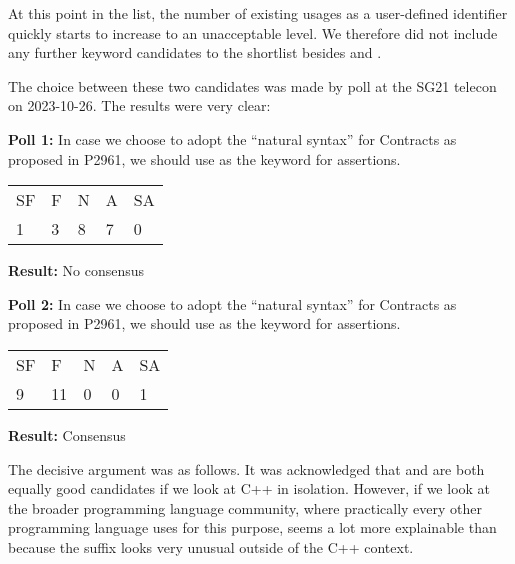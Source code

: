 At this point in the list, the number of existing usages as a user-defined identifier quickly starts to increase to an unacceptable level. We therefore did not include any further keyword candidates to the shortlist besides  and .

\pagebreak %

The choice between these two candidates was made by poll at the SG21 telecon on 2023-10-26. The results were very clear:



\begin{adjustwidth}{0.5cm}{0.5cm}
\textbf{Poll 1:} In case we choose to adopt the ``natural syntax'' for Contracts as proposed in 
P2961, we should use  as the keyword for assertions.

\begin{tabular}{lllll}
SF & F & N & A & SA \\
1 & 3 & 8 & 7 & 0
\end{tabular}

\textbf{Result:} No consensus
\end{adjustwidth}

\begin{adjustwidth}{0.5cm}{0.5cm}
\textbf{Poll 2:} In case we choose to adopt the ``natural syntax'' for Contracts as proposed in 
P2961, we should use  as the keyword for assertions.

\begin{tabular}{lllll}
SF & F & N & A & SA \\
9 & 11 & 0 & 0 & 1
\end{tabular}

\textbf{Result:} Consensus
\end{adjustwidth}

The decisive argument was as follows. It was acknowledged that  and  are both equally good candidates if we look at C++ in isolation. However, if we look at the broader programming language community, where practically every other programming language uses  for this purpose,  seems a lot more explainable than  because the  suffix looks very unusual outside of the C++ context.


